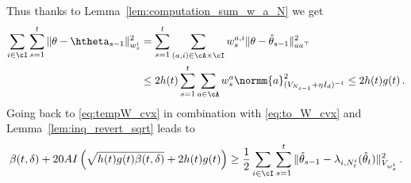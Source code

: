 Thus thanks to Lemma~\ref{lem:computation_sum_w_a_N} we get
\begin{align*}
    \sum_{i\in\cI}\sum_{s=1}^t \Vert \theta - \htheta_{s-1} \Vert_{w_s^i}^2 &= \sum_{s=1}^t \sum_{(a,i)\in\cA\times\cI} w_s^{a,i}\Vert \theta - \hat{\theta}_{s-1} \Vert_{a a^\top}^2\\
    &\leq 2h(t)\sum_{s=1}^t \sum_{a\in\cA} w_s^{a} \normm{ a }_{(V_{N_{s-1}}+\eta I_d)^{-1}}^2 \leq 2h(t)g(t)\,.
\end{align*}
Going back to \eqref{eq:tempW_cvx} in combination with \eqref{eq:to_W_cvx} and Lemma~\ref{lem:inq_revert_sqrt} leads to
\begin{align}
\label{eq:to_hteta_cvx}
\beta(t,\delta) + 20 AI \left(\sqrt{h(t)g(t) \beta(t,\delta)}+ 2h(t)g(t)\right)   \geq
\frac{1}{2}\sum_{i\in\cI}\sum_{s=1}^t \Vert \hat{\theta}_{s-1} - \lambda_{i,N_t^i}(\hat{\theta}_t)\Vert_{V_{w_s^i}}^2\,.
\end{align}
%
%

